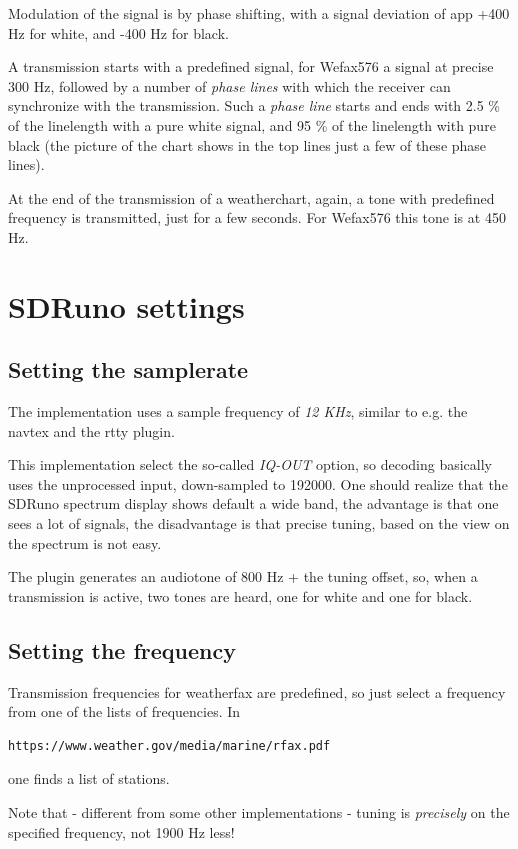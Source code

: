 \documentclass[11pt]{article}
\begin{document}
Modulation of the signal is by phase shifting, with a signal deviation of
app  +400 Hz for white, and -400 Hz for black.

A transmission starts with a predefined signal, for Wefax576
a signal at precise 300 Hz,
followed by a number of {\em phase lines} with which the receiver can synchronize
with the transmission.
Such a {\em phase line} starts and ends with 2.5 \% of the linelength
with a pure white signal, and 95 \% of the linelength with pure black
(the picture of the chart shows in the top lines just a few of these
phase lines).

At the end of the transmission of a weatherchart, again, a tone
with predefined frequency is transmitted, just for a few seconds.
For Wefax576 this tone is at 450 Hz.

\section{SDRuno settings}
\subsection{Setting the samplerate}
The implementation uses a sample frequency of {\em 12 KHz},
similar to e.g. the navtex and the rtty plugin.

This implementation select the so-called {\em IQ-OUT} option, so
decoding basically uses the unprocessed input, down-sampled to 192000.
One should realize that the SDRuno spectrum display shows default a
wide band, the advantage is that one sees a lot of signals, the disadvantage
is that precise tuning, based on the view on the spectrum is not easy.

The plugin generates an audiotone of 800 Hz + the tuning offset,
so, when a transmission is active, two tones are heard, one for
white and one for black.

\subsection{Setting the frequency}

Transmission frequencies for weatherfax are predefined, so just select
a frequency from one of the lists of frequencies.
In 
\begin{verbatim}
https://www.weather.gov/media/marine/rfax.pdf
\end{verbatim}
one finds a list of stations.
\par
Note that - different from some other implementations - tuning is
{\em precisely} on the specified frequency, not 1900 Hz less!
\end{document}
